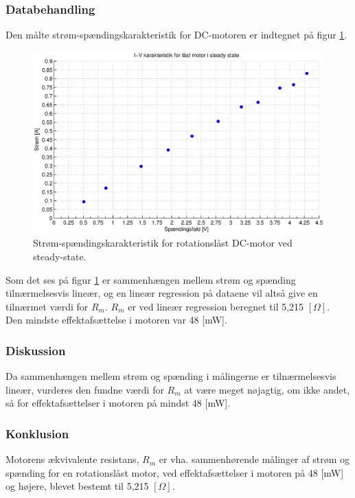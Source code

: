 \subsubsection{Databehandling}
Den målte strøm-spændingskarakteristik for DC-motoren er indtegnet på figur \ref{fig:resistans0}.
\begin{figure}[th!]
	\centering
	\includegraphics[width=1\textwidth]{./graphics/resistans1.eps}
	\caption[Strøm-spændingskarakteristik for rotationslåst DC-motor]{Strøm-spændingskarakteristik for rotationslåst DC-motor ved steady-state.}
	\label{fig:resistans0}
\end{figure}
Som det ses på figur \ref{fig:resistans0} er sammenhængen mellem strøm og spænding
tilnærmelsesvis lineær, og en lineær regression på dataene vil altså give en tilnærmet værdi for \(R_m\).
\(R_m\) er ved lineær regression beregnet til 5,215 \([\Omega]\).\\
Den mindste effektafsættelse i motoren var 48 [mW].

\subsubsection{Diskussion}
Da sammenhængen mellem strøm og spænding i målingerne er tilnærmelsesvis lineær,
vurderes den fundne værdi for \(R_m\) at være meget nøjagtig,
om ikke andet, så for effektafsættelser i motoren på mindst 48 [mW].

\subsubsection{Konklusion}
Motorens ækvivalente resistans, \(R_m\) er vha. sammenhørende målinger af strøm og spænding
for en rotationslåst motor, ved effektafsættelser i motoren på 48 [mW] og højere,
blevet bestemt til 5,215 \([\Omega]\).

